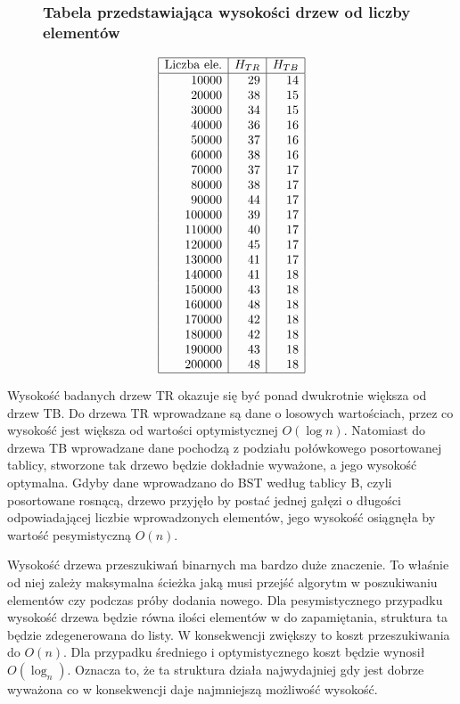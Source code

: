 \documentclass[polish,polish,a4paper]{article}
\begin{document}
\begin{spacing}{1.5}
\begin{figure}[H]
	\subsubsection*{Tabela przedstawiająca wysokości drzew od liczby elementów}
	\centering
	\begin{equation*}
	\begin{array}{|r|r|r|}
	\hline
	\multicolumn{1}{|c|}{$Liczba ele.$}&\multicolumn{1}{c|}{H_{TR}}&\multicolumn{1}{c|}{H_{TB}}\\ \hline
10000&29&14\\
20000&38&15\\
30000&34&15\\
40000&36&16\\
50000&37&16\\
60000&38&16\\
70000&37&17\\
80000&38&17\\
90000&44&17\\
100000&39&17\\
110000&40&17\\
120000&45&17\\
130000&41&17\\
140000&41&18\\
150000&43&18\\
160000&48&18\\
170000&42&18\\
180000&42&18\\
190000&43&18\\
200000&48&18\\\hline
	\end{array}
	\end{equation*}
\end{figure}


Wysokość badanych drzew TR okazuje się być ponad dwukrotnie większa od drzew TB. Do drzewa TR wprowadzane są dane o losowych wartościach, przez co wysokość jest większa od wartości optymistycznej $O(\log{n})$. Natomiast do drzewa TB wprowadzane dane pochodzą z podziału połówkowego posortowanej tablicy, stworzone tak drzewo będzie dokładnie wyważone, a jego wysokość optymalna.
Gdyby dane wprowadzano do BST według tablicy B, czyli posortowane rosnącą, drzewo przyjęło by postać jednej gałęzi o długości odpowiadającej liczbie wprowadzonych elementów, jego wysokość osiągnęła by wartość pesymistyczną $ O(n) $.

Wysokość drzewa przeszukiwań binarnych ma bardzo duże znaczenie. To właśnie od niej zależy maksymalna ścieżka jaką musi przejść algorytm w poszukiwaniu elementów czy  podczas próby dodania nowego. Dla pesymistycznego przypadku wysokość drzewa będzie równa ilości elementów w do zapamiętania, struktura ta będzie zdegenerowana do listy. W konsekwencji zwiększy to koszt przeszukiwania do $ O(n) $. Dla przypadku średniego i optymistycznego koszt będzie wynosił $ O(\log_{n}) $. Oznacza to, że ta struktura działa najwydajniej gdy jest dobrze wyważona co w konsekwencji daje najmniejszą możliwość wysokość.


\end{spacing}
\end{document}
